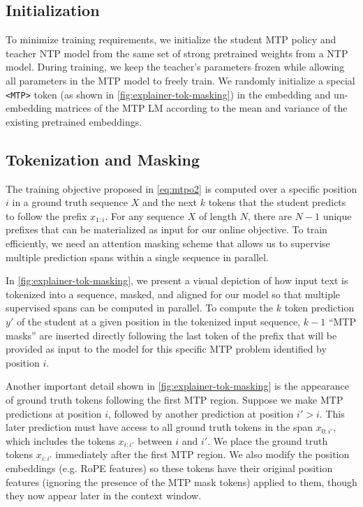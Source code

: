 \documentclass{article}
\theoremstyle{plain}
\theoremstyle{definition}
\theoremstyle{remark}
\begin{document}
\subsection{Initialization}\label{sec:impl-init}

To minimize training requirements, we initialize the student MTP policy and teacher NTP model from the same set of strong pretrained weights from a NTP model. During training, we keep the teacher's parameters frozen while allowing all parameters in the MTP model to freely train.  We randomly initialize a special \verb|<MTP>| token (as shown in \cref{fig:explainer-tok-masking}) in the embedding and un-embedding matrices of the MTP LM according to the mean and variance of the existing pretrained embeddings.

\subsection{Tokenization and Masking}\label{sec:impl-tok-mask}

The training objective proposed in \cref{eq:mtpo2} is computed over a specific position $i$ in a ground truth sequence $X$ and the next $k$ tokens that the student predicts to follow the prefix $x_{1:i}$. For any sequence $X$ of length $N$, there are $N-1$ unique prefixes that can be materialized as input for our online objective. To train efficiently, we need an attention masking scheme that allows us to supervise multiple prediction spans within a single sequence in parallel.

In \cref{fig:explainer-tok-masking}, we present a visual depiction of how input text is tokenized into a sequence, masked, and aligned for our model so that multiple supervised spans can be computed in parallel. To compute the $k$ token prediction $y'$ of the student at a given position in the tokenized input sequence, $k-1$ ``MTP masks'' are inserted directly following the last token of the prefix that will be provided as input to the model for this specific MTP problem identified by position $i$.

Another important detail shown in \cref{fig:explainer-tok-masking} is the appearance of ground truth tokens following the first MTP region. Suppose we make MTP predictions at position $i$, followed by another prediction at position $i'>i.$ This later prediction must have access to all ground truth tokens in the span $x_{0:i'}$, which includes the tokens $x_{i:i'}$ between $i$ and $i'$.  We place the ground truth tokens $x_{i:i'}$ immediately after the first MTP region. We also modify the position embeddings (e.g. RoPE features) so these tokens have their original position features (ignoring the presence of the MTP mask tokens) applied to them, though they now appear later in the context window.
\end{document}
